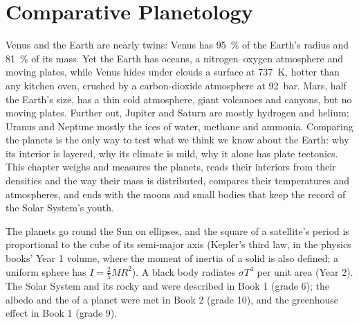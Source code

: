 \chapter{Comparative Planetology}\label{ch:b1:comparative-planetology}

Venus and the Earth are nearly twins: Venus has \qty{95}{\percent} of the
Earth's radius and \qty{81}{\percent} of its mass. Yet the Earth has oceans,
a nitrogen--oxygen atmosphere and moving plates, while Venus hides under
clouds a surface at \qty{737}{K}, hotter than any kitchen oven, crushed by
a carbon-dioxide atmosphere at \qty{92}{bar}. Mars, half the Earth's size,
has a thin cold atmosphere, giant volcanoes and canyons, but no moving
plates. Further out, Jupiter and Saturn
are mostly hydrogen and helium; Uranus and Neptune mostly the ices of water,
methane and ammonia. Comparing the planets is the only way to test what we
think we know about the Earth: why its interior is layered, why its climate
is mild, why it alone has plate tectonics. This chapter weighs and measures
the planets, reads their interiors from their densities and the way their
mass is distributed, compares their temperatures and atmospheres, and ends
with the moons and small bodies that keep the record of the Solar System's
youth.

\begin{recall}
The planets go round the Sun on ellipses, and the square of a satellite's
period is proportional to the cube of its semi-major axis (Kepler's third
law, in the physics books' Year 1 volume, where the moment of inertia of a
solid is also defined; a uniform sphere has $I = \tfrac25MR^2$). A black
body radiates $\sigma T^4$ per unit area (Year 2). The Solar System and its
rocky and  were described in Book 1 (grade 6); the albedo and
the  of a planet were met in Book 2 (grade 10), and
the greenhouse effect in Book 1 (grade 9).
\end{recall}

